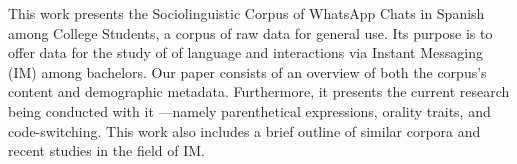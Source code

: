 This work presents the Sociolinguistic Corpus of WhatsApp Chats in Spanish among College Students, a corpus of raw data for general use. Its purpose is to offer data for the study of of language and interactions via Instant Messaging (IM) among bachelors. Our paper consists of an overview of both the corpus's content and demographic metadata. Furthermore, it presents the current research being conducted with it —namely parenthetical expressions, orality traits, and code-switching. This work also includes a brief outline of similar corpora and recent studies in the field of IM.
